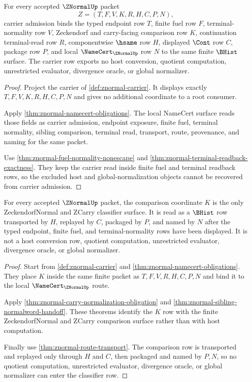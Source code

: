 \begin{theorem}
\label{thm:znormal-carrier-obligation-row}
For every accepted $\ZNormalUp$ packet
$$
Z=(T,F,V,K,R,H,C,P,N),
$$
carrier admission binds the typed endpoint row $T$, finite fuel row $F$, terminal-normality row $V$, Zeckendorf and carry-facing comparison row $K$, continuation terminal-read row $R$, componentwise $\hsame$ row $H$, displayed $\Cont$ row $C$, package row $P$, and local $\NameCert_{\ZNormalUp}$ row $N$ to the same finite $\BHist$ surface. The carrier row exports no host conversion, quotient computation, unrestricted evaluator, divergence oracle, or global normalizer.
\end{theorem}
\begin{proof}
Project the carrier of \autoref{def:znormal-carrier}. It displays exactly $T,F,V,K,R,H,C,P,N$ and gives no additional coordinate to a root consumer.

Apply \autoref{thm:znormal-namecert-obligations}. The local NameCert surface reads those fields as carrier admission, endpoint exposure, finite fuel, terminal normality, sibling comparison, terminal read, transport, route, provenance, and naming for the same packet.

Use \autoref{thm:znormal-fuel-normality-nonescape} and \autoref{thm:znormal-terminal-readback-exactness}. They keep the carrier read inside finite fuel and terminal readback rows, so the excluded host and global-normalization objects cannot be recovered from carrier admission.
\end{proof}

\begin{theorem}
\label{thm:znormal-carry-classifier-row}
For every accepted $\ZNormalUp$ packet, the comparison coordinate $K$ is the only ZeckendorfNormal and ZCarry classifier surface. It is read as a $\BHist$ row transported by $H$, replayed by $C$, packaged by $P$, and named by $N$ after the typed endpoint, finite fuel, and terminal-normality rows have been displayed. It is not a host conversion row, quotient computation, unrestricted evaluator, divergence oracle, or global normalizer.
\end{theorem}
\begin{proof}
Start from \autoref{def:znormal-carrier} and \autoref{thm:znormal-namecert-obligations}. They place $K$ inside the same finite packet as $T,F,V,R,H,C,P,N$ and bind it to the local $\NameCert_{\ZNormalUp}$ route.

Apply \autoref{thm:znormal-carry-normalization-obligation} and \autoref{thm:znormal-sibling-normalword-handoff}. These theorems identify the $K$ row with the finite ZeckendorfNormal and ZCarry comparison surface rather than with host computation.

Finally use \autoref{thm:znormal-route-transport}. The comparison row is transported and replayed only through $H$ and $C$, then packaged and named by $P,N$, so no quotient computation, unrestricted evaluator, divergence oracle, or global normalizer can enter the classifier row.
\end{proof}

